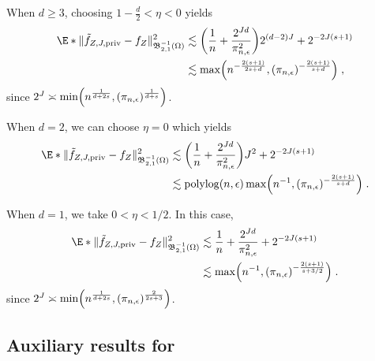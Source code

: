\documentclass{article}
\newcommand{\1}{\mathds{1}}
\DeclarePairedDelimiter{\paren}{\lparen}{\rparen}
\theoremstyle{plain}
\theoremstyle{definition}
\theoremstyle{remark}
\begin{document}
When $d \geq 3$, choosing $ 1 - \frac{d}{2} <\eta < 0$ yields 
\begin{equation}
    \begin{aligned}
        \E*{\| \tilde{f}_{Z,J, \textrm{priv}} - f_Z\|_{{\mathfrak{B}}_{2, 1}^{-1}(\Omega)}^2}
        &\lesssim 
        \paren*{\frac{1}{n} + \frac{2^{Jd}}{\pi_{n,\epsilon}^2}} 2^{(d-2)J}
    + 2^{-2J(s+1)} \\
    &\lesssim 
    \max \paren*{n^{- \frac{2 (s + 1)}{ 2 s + d}}, (\pi_{n,\epsilon})^{- \frac{2 (s + 1)}{ s + d}}}\;,
    \end{aligned}
\end{equation}
since $2^J \asymp \min \paren*{n^{\frac{1}{d + 2s}}, (\pi_{n,\epsilon})^{\frac{1}{d+s}}}$.

When $d = 2$, we can choose $\eta = 0$ which yields
\begin{equation}
    \begin{aligned}
        \E*{\| \tilde{f}_{Z,J, \textrm{priv}} - f_Z\|_{{\mathfrak{B}}_{2, 1}^{-1}(\Omega)}^2}
        &\lesssim 
        \paren*{\frac{1}{n} + \frac{2^{Jd}}{\pi_{n,\epsilon}^2}} J^2
    + 2^{-2J(s+1)} \\
    &\lesssim 
    \mathrm{polylog}(n, \epsilon)
    \max \paren*{n^{- 1 }, (\pi_{n,\epsilon})^{- \frac{2 (s + 1)}{ s + d}}}\;.
    \end{aligned}
\end{equation}

When $d=1$, we take $0 < \eta < 1/2$. In this case,
\begin{equation}
    \begin{aligned}
        \E*{\| \tilde{f}_{Z,J, \textrm{priv}} - f_Z\|_{{\mathfrak{B}}_{2, 1}^{-1}(\Omega)}^2}
        &\lesssim 
        \frac{1}{n} + \frac{2^{Jd}}{\pi_{n,\epsilon}^2}
    + 2^{-2J(s+1)} \\
    &\lesssim 
    \max \paren*{n^{- 1 }, (\pi_{n,\epsilon})^{- \frac{2 (s + 1)}{ s + 3/2}}}\;.
    \end{aligned}
\end{equation}
since $2^J \asymp \min \paren*{n^{\frac{1}{d + 2s}}, (\pi_{n,\epsilon})^{\frac{2}{2s + 3}}}$.


\subsection{Auxiliary results for }
\end{document}
